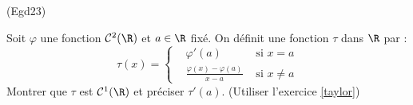 \begin{tiny}(Egd23)\end{tiny} Soit $\varphi$ une fonction $\mathcal{C}^2(\R)$ et $a\in \R$ fixé. On définit une fonction $\tau$ dans $\R$ par :
\begin{displaymath}
 \tau(x)=
\left\lbrace 
\begin{aligned}
 &\varphi'(a) &\text{ si }x=a \\
 &\frac{\varphi(x)-\varphi(a)}{x-a}&\text{ si } x\neq a
\end{aligned}
\right. 
\end{displaymath}
Montrer que $\tau$ est $\mathcal{C}^1(\R)$ et préciser $\tau'(a)$. (Utiliser l'exercice \ref{taylor})